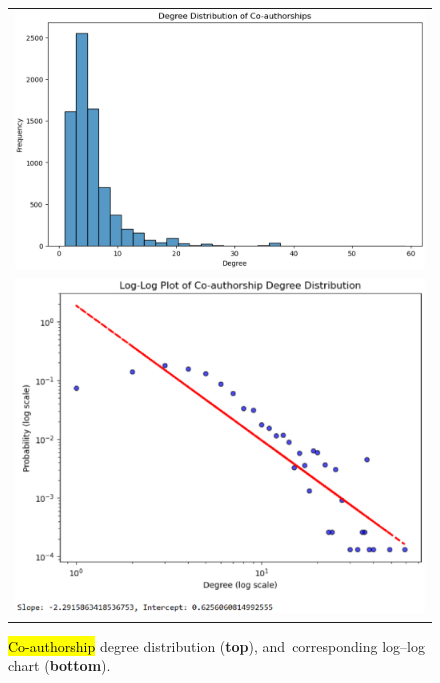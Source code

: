 \documentclass[jmse,review,accept,pdftex,moreauthors]{Definitions/mdpi}
\begin{document}
\begin{figure}[H]
\begin{tabular}{c}
	\includegraphics[height=0.33\textheight, keepaspectratio]{pics/coauthorship_degree_distribution.eps}\\
	\includegraphics[height=0.4\textheight, keepaspectratio]{pics/coauthorship_degree_distribution_loglog_chart.eps}\\
\end{tabular}
	\caption{\hl{Co-authorship} %
 degree distribution (\textbf{top}), and~corresponding log--log chart (\textbf{bottom}).}\label{fig:fig3}
\end{figure}
\end{document}
